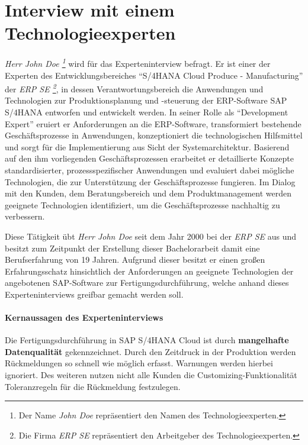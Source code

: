\tocless\section{Interview mit einem Technologieexperten}\label{ah:interviewDev}

\textit{Herr John Doe \footnote{Der Name \textit{John Doe} repräsentiert den Namen des Technologieexperten.}} wird für das Experteninterview befragt.
 Er ist einer der Experten des Entwicklungsbereiches \enquote{S/4HANA Cloud Produce - Manufacturing} der \textit{ERP SE \footnote{Die Firma \textit{ERP SE} repräsentiert den Arbeitgeber des Technologieexperten.}}, in dessen Verantwortungsbereich die Anwendungen und Technologien zur Produktionsplanung und -steuerung der \ac{ERP}-Software SAP S/4HANA entworfen und entwickelt werden.
 In seiner Rolle als \enquote{Development Expert} eruiert er Anforderungen an die \ac{ERP}-Software, transformiert bestehende Geschäftsprozesse in Anwendungen, konzeptioniert die technologischen Hilfsmittel und sorgt für die Implementierung aus Sicht der Systemarchitektur. Basierend auf den ihm vorliegenden Geschäftsprozessen erarbeitet er detaillierte Konzepte standardisierter, prozessspezifischer Anwendungen und evaluiert dabei mögliche Technologien, die zur Unterstützung der Geschäftsprozesse fungieren. Im Dialog mit den Kunden, dem Beratungsbereich und dem Produktmanagement werden geeignete Technologien identifiziert, um die Geschäftsprozesse nachhaltig zu verbessern. 
 
Diese Tätigkeit übt \textit{Herr John Doe} seit dem Jahr 2000 bei der \textit{ERP SE} aus und besitzt zum Zeitpunkt der Erstellung dieser Bachelorarbeit damit eine Berufserfahrung von 19 Jahren. Aufgrund dieser besitzt er einen großen Erfahrungsschatz hinsichtlich der Anforderungen an geeignete Technologien der angebotenen SAP-Software zur Fertigungsdurchführung, welche anhand dieses Experteninterviews greifbar gemacht werden soll.

\paragraph{Kernaussagen des Experteninterviews}

\begin{definitionForm}[KA-T-1]
Die Fertigungsdurchführung in SAP S/4HANA Cloud ist durch \textbf{mangelhafte Datenqualität} gekennzeichnet. Durch den Zeitdruck in der Produktion werden Rückmeldungen so schnell wie möglich erfasst. Warnungen werden hierbei ignoriert. Des weiteren nutzen nicht alle Kunden die Customizing-Funktionalität Toleranzregeln für die Rückmeldung festzulegen.
\end{definitionForm}

